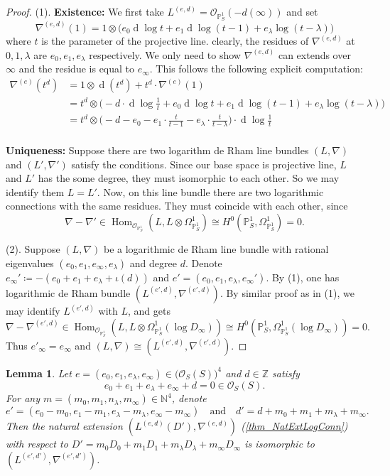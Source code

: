\documentclass[12pt,twoside]{book}
\theoremstyle{plain}
\newtheorem{lemma}[lemma]{Lemma}
\theoremstyle{definition}
\theoremstyle{remark}
\newcommand{\bN}{{\mathbb N}}
\newcommand{\bP}{{\mathbb P}}
\newcommand{\bZ}{{\mathbb Z}}
\newcommand{\mO}{{\mathcal O}}
\DeclareMathOperator\rmd{d}
\DeclareMathOperator\Hom{Hom}
\numberwithin{equation}{section}
\begin{document}
\begin{proof}
(1). \textbf{Existence:} We first take $L^{(e,d)}=\mO_{\bP^1_S}(-d(\infty))$ and set
\[\nabla^{(e,d)}(1) = 1\otimes \Big(e_0 \rmd\log t + e_1\rmd\log(t-1) + e_\lambda \log(t-\lambda)\Big)\]
where $t$ is the parameter of the projective line. clearly, the residues of $\nabla^{(e,d)}$ at $0,1,\lambda$ are $e_0,e_1,e_\lambda$ respectively. We only need to show $\nabla^{(e,d)}$ can extends over $\infty$ and the residue is equal to $e_\infty$. This follows the following explicit computation:
\begin{equation*}
\begin{split}
\nabla^{(e)}\left(t^d\right) & = 1\otimes \rmd\left(t^d\right) + t^d\cdot\nabla^{(e)}\left(1\right)\\
& = t^d \otimes \Big(-d\cdot\rmd\log\frac1t + e_0 \rmd\log t + e_1\rmd\log(t-1) + e_\lambda \log(t-\lambda)\Big) \\
& = t^d \otimes \Big(-d-e_0 -e_1\cdot\frac{t}{t-1} - e_\lambda\cdot\frac{t}{t-\lambda}\Big)\cdot \rmd\log\frac1t\\
\end{split}
\end{equation*}

\textbf{Uniqueness:} Suppose there are two logarithm de Rham line bundles $(L,\nabla)$ and $(L',\nabla')$ satisfy the conditions. Since our base space is projective line, $L$ and $L'$ has the some degree, they must isomorphic to each other. So we may identify them $L=L'$. Now, on this line bundle there are two logarithmic connections with the same residues. They must coincide with each other, since
\[\nabla-\nabla'\in \Hom_{\mO_{\bP^1_S}}(L,L \otimes \Omega^1_{\bP^1_S}) \cong H^0(\bP^1_S,\Omega^1_{\bP^1_S})=0.\]

(2). Suppose $(L,\nabla)$ be a logarithmic de Rham line bundle with rational eigenvalues $(e_0,e_1,e_\infty,e_\lambda)$ and degree $d$. Denote $e_\infty'\coloneqq -(e_0+e_1+e_\lambda+\iota(d))$ and $e'=(e_0,e_1,e_\lambda,e_\infty')$. By (1), one has logarithmic de Rham bundle $(L^{(e',d)},\nabla^{(e',d)})$. By similar proof as in (1), we may identify $L^{(e',d)}$ with $L$, and gets
\[\nabla-\nabla^{(e',d)} \in \Hom_{\mO_{\bP^1_S}}(L,L \otimes \Omega^1_{\bP^1_S}(\log D_\infty)) \cong H^0(\bP^1_S,\Omega^1_{\bP^1_S}(\log D_\infty))=0.\]
Thus $e'_\infty=e_\infty$ and $(L,\nabla)\cong (L^{(e',d)},\nabla^{(e',d)})$.
\end{proof}

\begin{lemma} Let $e=(e_0,e_1,e_\lambda,e_\infty)\in \Big(\mO_S(S)\Big)^4$ and $d\in \bZ$ satisfy
\[e_0+e_1+e_\lambda+e_\infty + d = 0 \in \mO_S(S).\]
For any $m=(m_0,m_1,n_\lambda,m_\infty)\in \bN^4$, denote
\[e' = (e_0-m_0,e_1-m_1,e_\lambda-m_\lambda,e_\infty-m_\infty) \quad \text{and} \quad d'=d+m_0+m_1+m_\lambda+m_\infty.\]
Then the natural extension $(L^{(e,d)}(D'),\nabla^{(e,d)})$ (\autoref{thm_NatExtLogConn}) with respect to $D'=m_0D_0 + m_1D_1 + m_\lambda D_\lambda + m_\infty D_\infty$ is isomorphic to $(L^{(e',d')},\nabla^{(e',d')})$.
\end{lemma}
\end{document}
